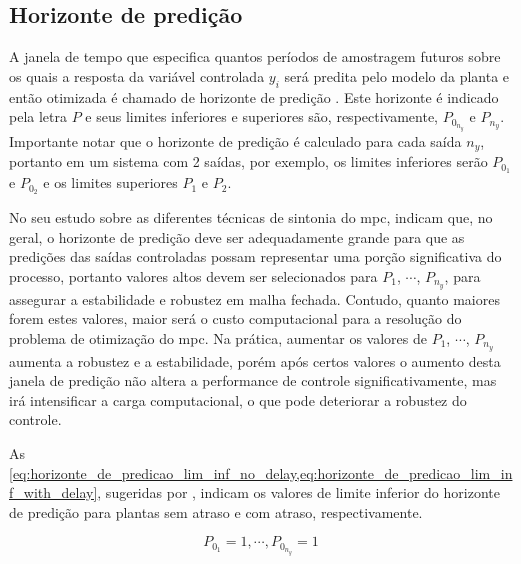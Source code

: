 \subsection{Horizonte de predição}
\label{subsec:horizonte_de_predicao}

A janela de tempo que especifica quantos períodos de amostragem futuros sobre os quais a resposta da 
variável controlada $y_i$ será predita pelo modelo da planta e então otimizada é chamado de horizonte
de predição \cite{Alhajeri2020}. Este horizonte é indicado pela letra $P$ e seus limites inferiores
e superiores são, respectivamente, $P_{0_{n_y}}$ e $P_{n_y}$. Importante notar que o horizonte de predição
é calculado para cada saída $n_y$, portanto em um sistema com 2 saídas, por exemplo, os limites inferiores
serão $P_{0_1}$ e $P_{0_2}$ e os limites superiores $P_1$ e $P_2$.

No seu estudo sobre as diferentes técnicas de sintonia do \acrshort{mpc},  indicam
que, no geral, o horizonte de predição deve ser adequadamente grande para que as predições das saídas
controladas possam representar uma porção significativa do processo, portanto valores altos devem
ser selecionados para $P_1$, $\cdots$, $P_{n_y}$, para assegurar a estabilidade e robustez em malha fechada.
Contudo, quanto maiores forem estes valores, maior será o custo computacional para a resolução do
problema de otimização do \acrshort{mpc}. Na prática, aumentar os valores de $P_1$, $\cdots$, $P_{n_y}$
aumenta a robustez e a estabilidade, porém após certos valores o aumento desta janela de predição não
altera a performance de controle significativamente, mas irá intensificar a carga computacional, o que
pode deteriorar a robustez do controle.

As \cref{eq:horizonte_de_predicao_lim_inf_no_delay,eq:horizonte_de_predicao_lim_inf_with_delay},
sugeridas por , indicam os valores de limite inferior do horizonte de predição
 para plantas sem atraso e com atraso, respectivamente.

\begin{equation}
	\label{eq:horizonte_de_predicao_lim_inf_no_delay}
    P_{0_1} = 1, \cdots, P_{0_{n_y}} = 1
\end{equation}

